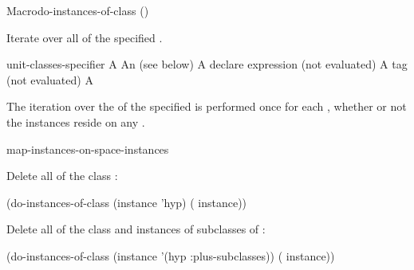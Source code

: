 \documentclass[10pt,twoside,english,pdftex]{article}
\begin{document}
\begin{functiondoc}{Macro}{do-instances-of-class}%
{()   
  \superstar{} 
  }
%
%

\fnsyntax

\fnpurpose Iterate over all  of the specified
.

\fnpackage {}

\fnmodule {}

\fnargs
\begin{args}{unit-classes-specifier}
\arg[var] A 
 An 
(see below)
\arg[declaration] A declare expression (not evaluated)
\arg[tag] A  tag (not evaluated)
\arg[form] A 
\end{args}

\fndsyntax
\W\supp\tabletop
\unitclassesspec
\subclassingspec

\fndescription The iteration over the  of the specified
 is performed once for each , whether
or not the instances reside on any .

\begin{alsos}{map-instances-on-space-instances}
\end{alsos}

\fnexamples
Delete all  of the class :
%
\W\supp
\begin{example}
  (do-instances-of-class (instance 'hyp)
    ( instance))
\end{example} 
%
Delete all  of the class  and
instances of subclasses of :
%
\W\supp\notpretop
\begin{example}
  (do-instances-of-class (instance '(hyp :plus-subclasses))
    ( instance))
\end{example} 


\end{functiondoc}
\end{document}
